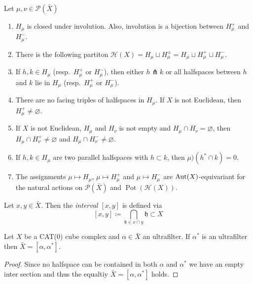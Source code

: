 \begin{lemma}[{\cite[Lem.\ 4.6]{MR3509968}}]
  \label{lem:4.6}
  Let \(\mu,\nu \in \mathcal{P}(\bar X)\)
  \begin{enumerate}
  \item \(H_\mu\) is closed under involution. Also, involution is a bijection between \(H_\mu^+\) and \(H_\mu^-\).
  \item There is the following partiton \(\mathcal{H}(X) = H_\mu \sqcup H_\mu^\pm = H_\mu \sqcup H_\mu^+ \sqcup H_\mu^-\).
  \item If \(h, k \in H_\mu\) (resp.\ \(H_\mu^+\) or \(H_\mu^-\)), then either \(h \pitchfork k\) or all halfspaces between \(h\) and \(k\) lie in \(H_\mu\) (resp.\ \(H_\mu^+\) or \(H_\mu^-\)).
  \item There are no facing triples of halfspaces in \(H_\mu\). If \(X\) is not Euclidean, then \(H_\mu^+ \neq \varnothing\).
  \item If \(X\) is not Euclidean, \(H_\mu\) and \(H_\nu\) is not empty and \(H_\mu \cap H_\nu = \varnothing\), then \(H_\mu \cap H_\nu^+ \neq \varnothing\) and \(H_\mu \cap H_\nu^- \neq \varnothing\).
  \item If \(h, k  \in H_\mu\) are two parallel halfspaces with \(h \subset k\), then \(\mu)(h^\ast \cap k) = 0\).
  \item The assignments \(\mu \mapsto H_\mu\), \(\mu \mapsto H_\mu^+\) and \(\mu \mapsto H_\mu^-\) are \(\operatorname{Aut}(X)\)-equivariant for the natural actions on \(\mathcal{P}(\bar X)\) and \(\operatorname{Pot}(\mathcal{H}(X))\).
  \end{enumerate}
\end{lemma}

\begin{defin}
  Let \(x,y \in \bar X\). Then the \emph{interval \([x,y]\)} is defined via
  \[
    [x,y] \coloneqq \bigcap_{\mathfrak{h} \in x \cap y} \mathfrak{h} \subset X
  \]
\end{defin}


\begin{lemma}
  Let \(X\) be a CAT(0) cube complex and \(\alpha \in \bar X\) an ultrafilter. If \(\alpha^\ast\) is an ultrafilter then \(\bar X = [\alpha, \alpha^\ast]\).
\end{lemma}

\begin{proof}
  Since no halfspace can be contained in both \(\alpha\) and \(\alpha^\ast\) we have an empty inter section and thus the equaltiy \(\bar X = [\alpha, \alpha^\ast]\) holds.
\end{proof}

